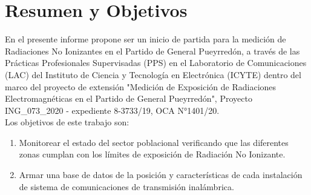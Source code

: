 \section{Resumen y Objetivos}

En el presente informe propone ser un inicio de partida para la medición de Radiaciones No Ionizantes en el Partido de General Pueyrredón, a través de las Prácticas Profesionales Supervisadas (PPS) en el Laboratorio de Comunicaciones (LAC) del Instituto de Ciencia y Tecnología en Electrónica (ICYTE) dentro del marco del proyecto de extensión "Medición de Exposición de Radiaciones Electromagnéticas en el Partido de General Pueyrredón", Proyecto ING\_073\_2020 - expediente 8-3733/19, OCA N°1401/20. \\

Los objetivos de este trabajo son:

\begin{enumerate}
\item Monitorear el estado del sector poblacional verificando que las diferentes zonas cumplan con los límites de exposición de Radiación No Ionizante.
\item Armar una base de datos de la posición y características de cada instalación de sistema de comunicaciones de transmisión inalámbrica.
\end{enumerate}       %
